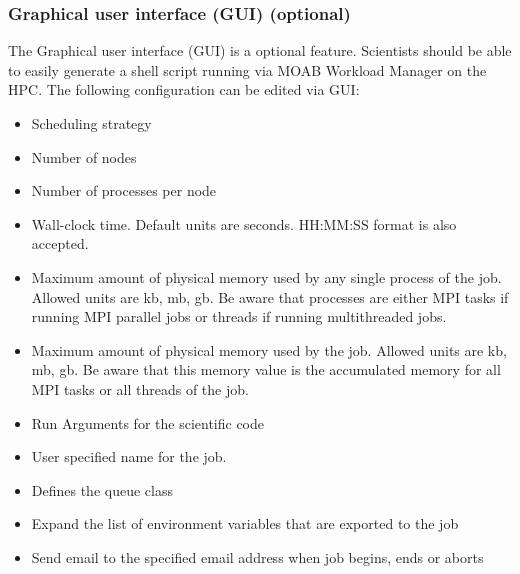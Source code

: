 	\subsubsection{Graphical user interface (GUI) (optional)}
		The Graphical user interface (GUI) is a optional feature. Scientists should be able to easily generate a shell script running via MOAB Workload Manager on the HPC. The following configuration can be edited via GUI:
		
		\begin{itemize}
			\item Scheduling strategy
			\item Number of nodes
			\item Number of processes per node
			\item Wall-clock time. Default units are seconds. 
			HH:MM:SS format is also accepted.
			\item Maximum amount of physical memory used by any single process of the job. Allowed units are kb, mb, gb. Be aware that processes are either MPI tasks if running MPI parallel jobs or threads if running multithreaded jobs.
			\item Maximum amount of physical memory used by the job.
			Allowed units are kb, mb, gb. Be aware that this memory value is the accumulated memory for all MPI tasks or all threads of the job.
			\item Run Arguments for the scientific code
			\item User specified name for the job.
			\item Defines the queue class
			\item Expand the list of environment variables that are exported to the job
			\item Send email to the specified email address when job begins, ends or aborts
		\end{itemize}
	
	